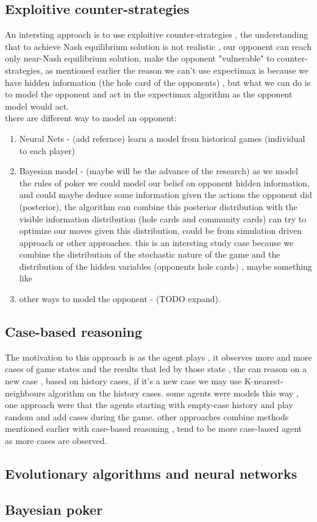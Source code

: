 \documentclass{article}
\begin{document}
\subsection{Exploitive counter-strategies}
An intersting approach is to use exploitive counter-strategies , the understanding that to achieve Nash equilibrium solution is not realistic , our opponent can reach only near-Nash equilibrium solution, make the opponent "vulnerable" to counter-strategies, as mentioned earlier the reason we can't use expectimax is because we have hidden information (the hole card of the opponents) , but what we can do is to model the opponent and act in the expectimax algorithm as the opponent model would act.\\
there are different way to model an opponent: \\
\begin{enumerate}
\item Neural Nets - (add refernce) learn a model from historical games (individual to each player) \\
\item Bayesian model - (maybe will be the advance of the research) as we model the rules of poker we could model our belief on opponent hidden information, and could maybe deduce some information given the actions the opponent did (posterior), the algorithm can combine this posterior distribution with the visible information distribution (hole cards and community cards)  can try to optimize our moves given this distribution, could be from simulation driven approach or other approaches. this is an intersting study case because we combine the distribution of the stochastic nature of the game and the distribution of the hidden variables (opponents hole cards) , maybe something like \cite{Seaman2018ProbabilisticPF}\\
\item other ways to model the opponent - (TODO expand).
\end{enumerate}

\subsection{Case-based reasoning}
The motivation to this approach is as the agent plays , it observes more and more cases of game states and the results that led by those state , the can reason on a new case , based on history cases, if it's a new case we may use K-nearest-neighbours algorithm on the history cases. 
some agents were models this way , one approach were that the agents starting with empty-case history and play random and add cases during the game. other approaches combine 
methods mentioned earlier with case-based reasoning , tend to be more case-based agent as more cases are observed. 
\subsection{Evolutionary algorithms and neural networks}

\subsection{Bayesian poker}



\end{document}
